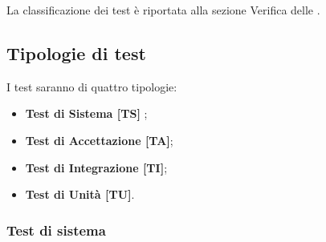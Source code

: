 La classificazione dei test è riportata alla sezione Verifica delle . \\

\subsection{Tipologie di test}
I test saranno di quattro tipologie:
\begin{itemize}
	\item \textbf{Test di Sistema [TS] };
	\item \textbf{Test di Accettazione [TA]};
	\item \textbf{Test di Integrazione [TI]};
	\item \textbf{Test di Unità [TU]}.\\
\end{itemize}

\subsubsection{Test di sistema}

